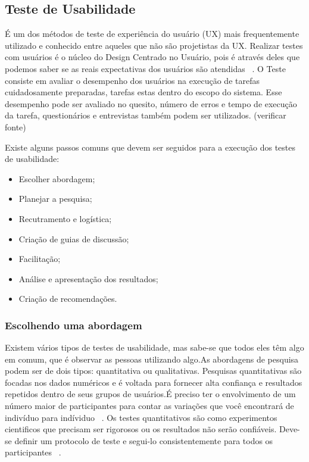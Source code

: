 \subsection{Teste de Usabilidade}

	É um dos métodos de teste de experiência do usuário (UX) mais frequentemente utilizado e conhecido entre aqueles que não são projetistas da UX.
	Realizar testes com usuários é o núcleo do Design Centrado no Usuário, pois é através deles que podemos saber se as reais expectativas dos usuários são atendidas ~\cite{santos2012}.
	O Teste consiste em avaliar o desempenho dos usuários na execução de tarefas cuidadosamente preparadas, tarefas estas dentro do escopo do sistema. Esse desempenho pode ser avaliado no quesito, número de erros e tempo de execução da tarefa, questionários e entrevistas também podem ser utilizados. (verificar fonte)

	Existe alguns passos comuns que devem ser seguidos para a execução dos testes de usabilidade:

\begin{itemize}

\item Escolher abordagem;
\item Planejar a pesquisa;
\item Recutramento e logística;
\item Criação de guias de discussão;
\item Facilitação;
\item Análise e apresentação dos resultados;
\item Criação de recomendações.
\end{itemize}

\subsubsection{Escolhendo uma abordagem}

	Existem vários tipos de testes de usabilidade, mas sabe-se que todos eles têm algo em comum, que é observar as pessoas utilizando algo.As abordagens de pesquisa podem ser de dois tipos: quantitativa ou qualitativas. 
	Pesquisas quantitativas são focadas nos dados numéricos e é voltada para fornecer alta confiança e resultados repetidos dentro de seus grupos de usuários.É preciso ter o envolvimento de um número maior de participantes para contar as variações que você encontrará de indivíduo para indíviduo ~\cite{unger2009}.
	Os testes quantitativos são como experimentos cientificos que precisam ser rigorosos ou os resultados não serão confiáveis. Deve-se definir um protocolo de teste e segui-lo consistentemente para todos os participantes ~\cite{krug2010}.

